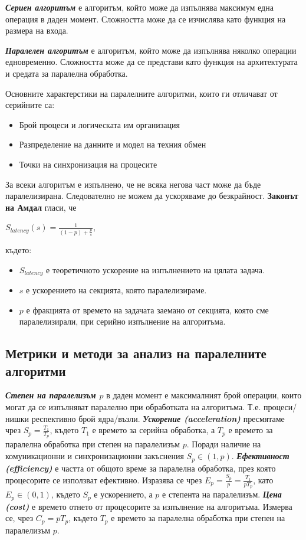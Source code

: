 \documentclass[fleqn,12pt]{article}
\begin{document}
\textbf{\textit{Сериен алгоритъм}} е алгоритъм, който може да изпълнява максимум една операция в даден момент.
Сложността може да се изчислява като функция на размера на входа.
\bigbreak

\textbf{\textit{Паралелен алгоритъм}} е алгоритъм, който може да изпълнява няколко операции едновременно.
Сложността може да се представи като функция на архитектурата и средата за паралелна обработка.

\bigbreak
Основните характерстики на паралелните алгоритми, които ги отличават от серийните са:
\begin{itemize}
    \item Брой процеси и логическата им организация
    \item Разпределение на данните и модел на техния обмен
    \item Точки на синхронизация на процесите
\end{itemize}
\bigbreak

За всеки алгоритъм е изпълнено, че не всяка негова част може да бъде паралелизирана.
Следователно не можем да ускоряваме до безкрайност.
\textbf{Законът на Амдал} гласи, че 
\begin{center}$S_{latency}(s) = \frac{1}{(1-p) + \frac{p}{s}}$, \end{center}
където:
\begin{itemize}
    \item $S_{latency}$ е теоретичното ускорение на изпълнението на цялата задача.
    \item $s$ е ускорението на секцията, която паралелизираме.
    \item $p$ е фракцията от времето на задачата заемано от секцията, която сме паралелизирали, при серийно изпълнение на алгоритъма.
\end{itemize}

\subsection{Метрики и методи за анализ на паралелните алгоритми}

\textbf{\textit{Степен на паралелизъм $p$}} в даден момент е максималният брой операции, които могат да се изпълняват паралелно при обработката на алгоритъма.
Т.е. процеси/нишки респективно брой ядра/възли.
\bigbreak
\textbf{\textit{Ускорение (acceleration)}} пресмятаме чрез $S_p = \frac{T_1}{T_p}$, където $T_1$ е времето за серийна обработка, а $T_p$ е времето за паралелна обработка при степен на паралелизъм $p$.
Поради наличие на комуникационни и синхронизационни закъснения $S_p \in (1, p)$.
\bigbreak
\textbf{\textit{Ефективност (efficiency)}} е частта от общото време за паралелна обработка, през която процесорите се използват ефективно.
Изразява се чрез $E_p = \frac{S_p}{p} = \frac{T_1}{pT_p}$, като $E_p \in (0, 1)$, където $S_p$ е ускорението, а $p$ е степента на паралелизъм.
\bigbreak
\textbf{\textit{Цена (cost)}} е времето отнето от процесорите за изпълнение на алгоритъма. Измерва се, чрез $C_p = pT_p$, където $T_p$ е времето за паралелна обработка при степен на паралелизъм $p$.
\bigbreak
\end{document}
